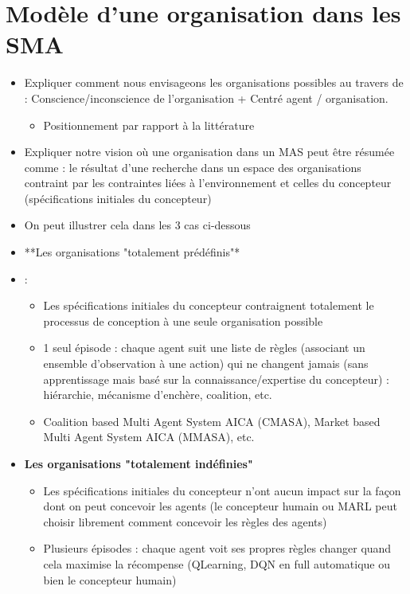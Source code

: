 \section{Modèle d'une organisation dans les SMA}
\begin{itemize}

    \item Expliquer comment nous envisageons les organisations possibles au travers de : Conscience/inconscience de l’organisation + Centré agent / organisation.
          \begin{itemize}
              \item Positionnement par rapport à la littérature
          \end{itemize}
    \item Expliquer notre vision où une organisation dans un MAS peut être résumée comme : le résultat d'une recherche dans un espace des organisations contraint par les contraintes liées à l'environnement et celles du concepteur (spécifications initiales du concepteur)
    \item On peut illustrer cela dans les 3 cas ci-dessous
    \item **Les organisations "totalement prédéfinis"*\item :
          \begin{itemize}
              \item Les spécifications initiales du concepteur contraignent totalement le processus de conception à une seule organisation possible
              \item 1 seul épisode : chaque agent suit une liste de règles (associant un ensemble d’observation à une action) qui ne changent jamais (sans apprentissage mais basé sur la connaissance/expertise du concepteur) : hiérarchie, mécanisme d’enchère, coalition, etc.
              \item Coalition based Multi Agent System AICA (CMASA), Market based Multi Agent System AICA (MMASA), etc.
          \end{itemize}
    \item \textbf{Les organisations "totalement indéfinies"}
          \begin{itemize}
              \item Les spécifications initiales du concepteur n'ont aucun impact sur la façon dont on peut concevoir les agents (le concepteur humain ou MARL peut choisir librement comment concevoir les règles des agents)
              \item Plusieurs épisodes : chaque agent voit ses propres règles changer quand cela maximise la récompense (QLearning, DQN en full automatique ou bien le concepteur humain)

\end{itemize}
\end{itemize}
